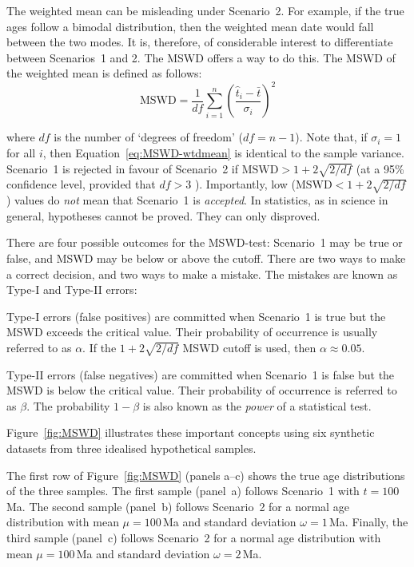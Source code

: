 \documentclass{article}
\begin{document}
The weighted mean can be misleading under Scenario~2. For example, if
the true ages follow a bimodal distribution, then the weighted mean
date would fall between the two modes.  It is, therefore, of
considerable interest to differentiate between Scenarios~1 and 2. The
MSWD offers a way to do this.  The MSWD of the weighted mean is
defined as follows:
\begin{equation}
  \mbox{MSWD} = \frac{1}{d\!f}\sum_{i=1}^n\left(\frac{\hat{t}_i-\bar{t}}{\sigma_i}\right)^2
  \label{eq:MSWD-wtdmean}
\end{equation}

\noindent where $d\!f$ is the number of `degrees of freedom'
($d\!f=n-1$). Note that, if $\sigma_i=1$ for all $i$, then
Equation~\ref{eq:MSWD-wtdmean} is identical to the sample variance.
Scenario~1 is rejected in favour of Scenario~2 if
$\mbox{MSWD}>1+2\sqrt{2/d\!f}$ (at a 95\% confidence level, provided
that $d\!f>3$ \cite{wendt1991}).  Importantly, low
($\mbox{MSWD}<1+2\sqrt{2/d\!f}$) values do \emph{not} mean that
Scenario~1 is \emph{accepted}. In statistics, as in science in
general, hypotheses cannot be proved. They can only disproved.

There are four possible outcomes for the MSWD-test: Scenario~1 may be
true or false, and MSWD may be below or above the cutoff. There are
two ways to make a correct decision, and two ways to make a
mistake. The mistakes are known as Type-I and Type-II errors:

\begin{description}
  \item{Type-I errors (false positives) are committed when Scenario~1
    is true but the MSWD exceeds the critical value. Their probability
    of occurrence is usually referred to as $\alpha$. If the
    $1+2\sqrt{2/d\!f}$ MSWD cutoff is used, then $\alpha\approx{0.05}$.}
  \item{Type-II errors (false negatives) are committed when Scenario~1
    is false but the MSWD is below the critical value. Their probability
    of occurrence is referred to as $\beta$. The probability $1-\beta$
    is also known as the \emph{power} of a statistical
    test\cite{cohen1992}.}
\end{description}

Figure~\ref{fig:MSWD} illustrates these important concepts using six
synthetic datasets from three idealised hypothetical samples.

The first row of Figure~\ref{fig:MSWD} (panels a--c) shows the true
age distributions of the three samples.  The first sample (panel~a)
follows Scenario~1 with $t=100$\,Ma.  The second sample (panel~b)
follows Scenario~2 for a normal age distribution with mean
$\mu=100$\,Ma and standard deviation $\omega=1$\,Ma. Finally, the
third sample (panel~c) follows Scenario~2 for a normal age
distribution with mean $\mu=100$\,Ma and standard deviation
$\omega=2$\,Ma.
\end{document}
